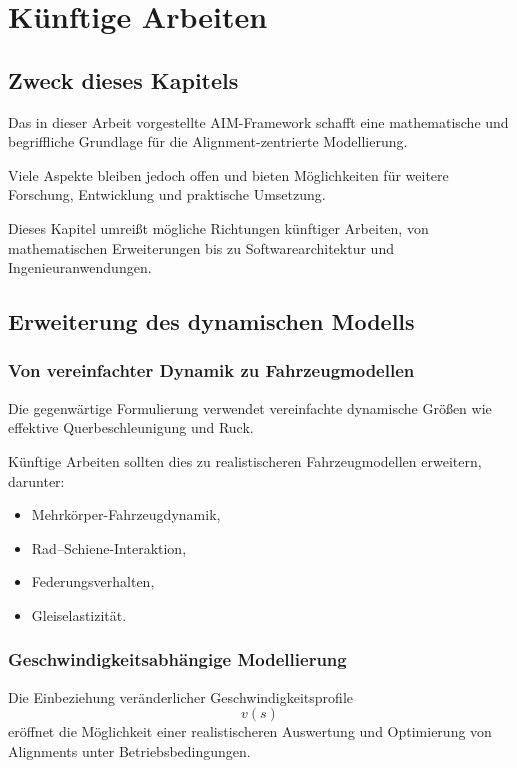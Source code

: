 \chapter{Künftige Arbeiten}

\section{Zweck dieses Kapitels}

Das in dieser Arbeit vorgestellte AIM-Framework schafft eine mathematische
und begriffliche Grundlage für die Alignment-zentrierte Modellierung.

Viele Aspekte bleiben jedoch offen und bieten Möglichkeiten für weitere
Forschung, Entwicklung und praktische Umsetzung.

Dieses Kapitel umreißt mögliche Richtungen künftiger Arbeiten, von
mathematischen Erweiterungen bis zu Softwarearchitektur und
Ingenieuranwendungen.

\section{Erweiterung des dynamischen Modells}

\subsection{Von vereinfachter Dynamik zu Fahrzeugmodellen}

Die gegenwärtige Formulierung verwendet vereinfachte dynamische Größen wie
effektive Querbeschleunigung und Ruck.

Künftige Arbeiten sollten dies zu realistischeren Fahrzeugmodellen
erweitern, darunter:
\begin{itemize}
\item Mehrkörper-Fahrzeugdynamik,
\item Rad--Schiene-Interaktion,
\item Federungsverhalten,
\item Gleiselastizität.
\end{itemize}

\subsection{Geschwindigkeitsabhängige Modellierung}

Die Einbeziehung veränderlicher Geschwindigkeitsprofile
\[
v(s)
\]
eröffnet die Möglichkeit einer realistischeren Auswertung und Optimierung
von Alignments unter Betriebsbedingungen.


